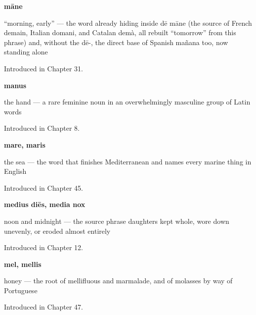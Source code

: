 \noindent\begin{minipage}[t]{\linewidth}
\raggedright
\textbf{māne}\par
\small \textquotedblleft{}morning, early\textquotedblright{} — the word already hiding inside dē māne (the source of French demain, Italian domani, and Catalan demà, all rebuilt \textquotedblleft{}tomorrow\textquotedblright{} from this phrase) and, without the dē-, the direct base of Spanish mañana too, now standing alone\par
\footnotesize Introduced in Chapter 31.
\end{minipage}\par\medskip

\noindent\begin{minipage}[t]{\linewidth}
\raggedright
\textbf{manus}\par
\small the hand — a rare feminine noun in an overwhelmingly masculine group of Latin words\par
\footnotesize Introduced in Chapter 8.
\end{minipage}\par\medskip

\noindent\begin{minipage}[t]{\linewidth}
\raggedright
\textbf{mare, maris}\par
\small the sea — the word that finishes Mediterranean and names every marine thing in English\par
\footnotesize Introduced in Chapter 45.
\end{minipage}\par\medskip

\noindent\begin{minipage}[t]{\linewidth}
\raggedright
\textbf{medius diēs, media nox}\par
\small noon and midnight — the source phrase daughters kept whole, wore down unevenly, or eroded almost entirely\par
\footnotesize Introduced in Chapter 12.
\end{minipage}\par\medskip

\noindent\begin{minipage}[t]{\linewidth}
\raggedright
\textbf{mel, mellis}\par
\small honey — the root of mellifluous and marmalade, and of molasses by way of Portuguese\par
\footnotesize Introduced in Chapter 47.
\end{minipage}\par\medskip

